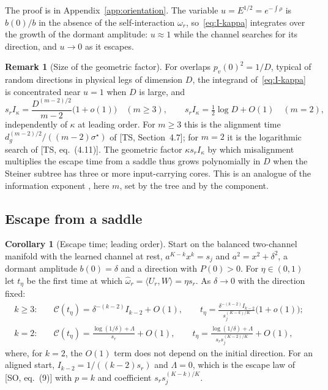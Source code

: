 \documentclass[11pt]{article}
\newcommand{\ip}[2]{\langle #1,#2\rangle}
\newcommand{\TS}{\textsf{TS}}
\newcommand{\SO}{\textsf{SO}}
\newcommand{\ts}[1]{[\TS, #1]}
\newcommand{\so}[1]{[\SO, #1]}
\newcommand{\Clk}{\mathcal{C}}
\theoremstyle{definition}
\newtheorem{corollary}[theorem]{Corollary}
\newtheorem{remark}[theorem]{Remark}
\numberwithin{equation}{section}
\begin{document}
The proof is in Appendix~\ref{app:orientation}. The variable $u=E^{1/2}=e^{-\int\rho}$ is $b(0)/b$ in the absence of the self-interaction $\omega_r$, so~\eqref{eq:I-kappa} integrates over the growth of the dormant amplitude: $u\approx1$ while the channel searches for its direction, and $u\to0$ as it escapes.

\begin{remark}[Size of the geometric factor]\label{rem:geometric}
For overlaps $p_v(0)^2=1/D$, typical of random directions in physical legs of dimension $D$, the integrand of~\eqref{eq:I-kappa} is concentrated near $u=1$ when $D$ is large, and
\[
s_rI_\kappa=\frac{D^{(m-2)/2}}{m-2}\big(1+o(1)\big)\quad(m\ge3),\qquad s_rI_\kappa=\tfrac12\log D+O(1)\quad(m=2),
\]
independently of $\kappa$ at leading order. For $m\ge3$ this is the alignment time $d_g^{(m-2)/2}/((m-2)\sigma^\star)$ of \ts{Section~4.7}; for $m=2$ it is the logarithmic search of \ts{eq.~(4.11)}. The geometric factor $\kappa s_rI_\kappa$ by which misalignment multiplies the escape time from a saddle thus grows polynomially in $D$ when the Steiner subtree has three or more input-carrying cores. This is an analogue of the information exponent \citep{benarous2021online}, here $m$, set by the tree and by the component.
\end{remark}

\subsection{Escape from a saddle}

\begin{corollary}[Escape time; leading order]\label{cor:escape}
Start on the balanced two-channel manifold with the learned channel at rest, $a^{K-k}x^k=s_j$ and $a^2=x^2+\delta^2$, a dormant amplitude $b(0)=\delta$ and a direction with $P(0)>0$. For $\eta\in(0,1)$ let $t_\eta$ be the first time at which $\hat\omega_r=\ip{U_r}{W}=\eta s_r$. As $\delta\to0$ with the direction fixed:
\begin{align}
k\ge3:&\quad \Clk(t_\eta)=\delta^{-(k-2)}I_{k-2}+O(1),\qquad t_\eta=\frac{\delta^{-(k-2)}I_{k-2}}{s_j^{(K-k)/K}}\big(1+o(1)\big);\label{eq:escape-k3}\\
k=2:&\quad \Clk(t_\eta)=\frac{\log(1/\delta)+\Lambda}{s_r}+O(1),\qquad t_\eta=\frac{\log(1/\delta)+\Lambda}{s_rs_j^{(K-2)/K}}+O(1),\label{eq:escape-k2}
\end{align}
where, for $k=2$, the $O(1)$ term does not depend on the initial direction. For an aligned start, $I_{k-2}=1/((k-2)s_r)$ and $\Lambda=0$, which is the escape law of \so{eq.~(9)} with $p=k$ and coefficient $s_rs_j^{(K-k)/K}$.
\end{corollary}
\end{document}
